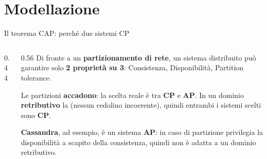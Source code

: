 \documentclass[aspectratio=169,11pt]{beamer}
\begin{document}
\section{Modellazione}
\begin{frame}{Il teorema CAP: perché due sistemi CP}
  \begin{columns}[c]
    \begin{column}{0.44\textwidth}
      \centering
    \end{column}
    \begin{column}{0.56\textwidth}
      Di fronte a un \textbf{partizionamento di rete}, un sistema distribuito può garantire solo \textbf{2 proprietà su 3}: Consistenza, Disponibilità, Partition tolerance.
      \vspace{0.5em}

      Le partizioni \textbf{accadono}: la scelta reale è tra \textbf{CP} e \textbf{AP}. In un dominio \textbf{retributivo} la  (nessun cedolino incoerente), quindi entrambi i sistemi scelti sono \textbf{CP}.
      \vspace{0.5em}

      \textbf{Cassandra}, ad esempio, è un sistema \textbf{AP}: in caso di partizione privilegia la disponibilità a scapito della consistenza, quindi non è adatta a un dominio retributivo.
    \end{column}
  \end{columns}
\end{frame}
\end{document}
